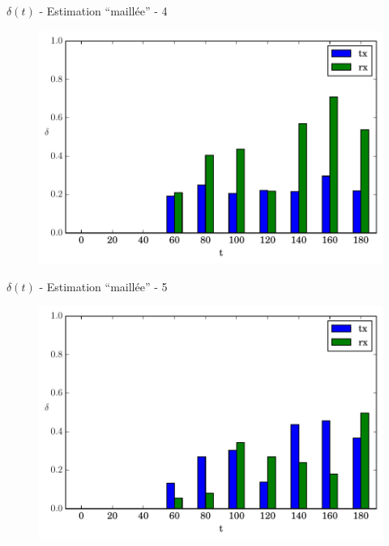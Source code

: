 \begin{frame}{$\delta(t)$ - Estimation ``maillée'' - 4}
  \begin{figure}
    \centering  
    \includegraphics[width=\textwidth]{figures/evolution_route_4.pdf}
  \end{figure}
\end{frame}

\begin{frame}{$\delta(t)$ - Estimation ``maillée'' - 5}
  \begin{figure}
    \centering  
    \includegraphics[width=\textwidth]{figures/evolution_route_5.pdf}
  \end{figure}
\end{frame}

